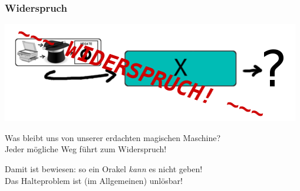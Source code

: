 \documentclass[aspectratio=43]{beamer}
\begin{document}
\begin{frame}
\frametitle{Widerspruch}
\begin{center}
\includegraphics[scale=1.4]{images/input_contradiction.png} 
\bigskip

Was bleibt uns von unserer erdachten magischen Maschine?\\
Jeder mögliche Weg führt zum Widerspruch!
\bigskip

Damit ist bewiesen: so ein Orakel \emph{kann} es nicht geben!\\
Das Halteproblem ist (im Allgemeinen) unlösbar!
\end{center}
\end{frame}

\end{document}
